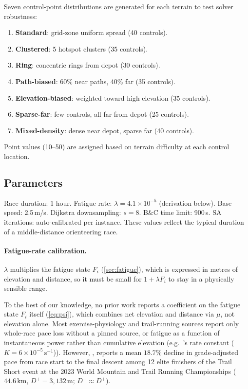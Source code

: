 \documentclass[11pt,a4paper]{article}
\begin{document}
Seven control-point distributions are generated for each terrain to test solver robustness:
\begin{enumerate}[nosep]
  \item \textbf{Standard}: grid-zone uniform spread (40 controls).
  \item \textbf{Clustered}: 5 hotspot clusters (35 controls).
  \item \textbf{Ring}: concentric rings from depot (30 controls).
  \item \textbf{Path-biased}: 60\% near paths, 40\% far (35 controls).
  \item \textbf{Elevation-biased}: weighted toward high elevation (35 controls).
  \item \textbf{Sparse-far}: few controls, all far from depot (25 controls).
  \item \textbf{Mixed-density}: dense near depot, sparse far (40 controls).
\end{enumerate}

Point values (10--50) are assigned based on terrain difficulty at each control location.
\subsection{Parameters}

Race duration: 1 hour.
Fatigue rate: $\lambda = 4.1 \times 10^{-5}$ (derivation below).
Base speed: 2.5\,m/s.
Dijkstra downsampling: $s = 8$.
B\&C time limit: 900\,s.
SA iterations: auto-calibrated per instance.
These values reflect the typical duration of a middle-distance orienteering race.

\paragraph{Fatigue-rate calibration.}
$\lambda$ multiplies the fatigue state $F_i$ (\cref{sec:fatigue}), which is expressed in metres of elevation and distance, so it must be small for $1+\lambda F_i$ to stay in a physically sensible range.

To the best of our knowledge, no prior work reports a coefficient on the fatigue state $F_i$ itself (\cref{eq:psi}), which combines net elevation and distance via $\mu$, not elevation alone.
Most exercise-physiology and trail-running sources report only whole-race pace loss without a pinned source, or fatigue as a function of instantaneous power rather than cumulative elevation (e.g.\ \citet{jaszczak2024}'s rate constant ($K = 6\times10^{-5}\,\mathrm{s}^{-1}$)).
However, \citet{jaencarrillo2025}, reports a mean $18.7\%$ decline in grade-adjusted pace from race start to the final descent among 12 elite finishers of the Trail Short event at the 2023 World Mountain and Trail Running Championships ($44.6\,\mathrm{km}$, $D^+ = 3{,}132\,\mathrm{m}$; $D^- \approx D^+$).
\end{document}
